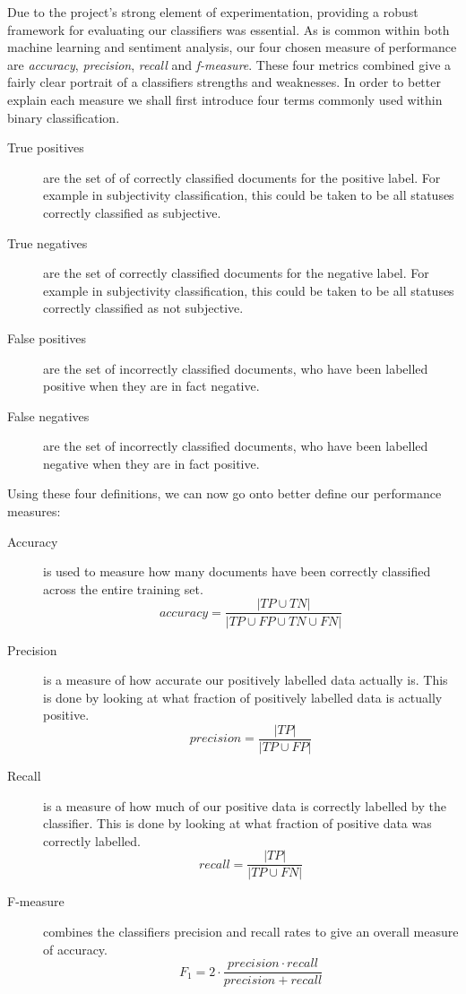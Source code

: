 Due to the project's strong element of experimentation, providing a robust framework for evaluating our classifiers was essential. As is common within both machine learning and sentiment analysis, our four chosen measure of performance are \emph{accuracy}, \emph{precision}, \emph{recall} and \emph{f-measure}. These four metrics combined give a fairly clear portrait of a classifiers strengths and weaknesses. In order to better explain each measure we shall first introduce four terms commonly used within binary classification.

\begin{description}
	\item [True positives] are the set of of correctly classified documents for the positive label. For example in subjectivity classification, this could be taken to be all statuses correctly classified as subjective.
	\item [True negatives] are the set of correctly classified documents for the negative label. For example in subjectivity classification, this could be taken to be all statuses correctly classified as not subjective.
	\item [False positives] are the set of incorrectly classified documents, who have been labelled positive when they are in fact negative.
	\item [False negatives] are the set of incorrectly classified documents, who have been labelled negative when they are in fact positive.
\end{description}

Using these four definitions, we can now go onto better define our performance measures:

\begin{description}
	\item [Accuracy] is used to measure how many documents have been correctly classified across the entire training set.
	\begin{equation}
		accuracy = \frac{| TP \cup TN |}{| TP \cup FP \cup TN \cup FN |}
	\end{equation}
	\item [Precision] is a measure of how accurate our positively labelled data actually is. This is done by looking at what fraction of positively labelled data is actually positive.
	\begin{equation}
		precision = \frac{| TP |}{| TP \cup FP |}
	\end{equation}
	\item [Recall] is a measure of how much of our positive data is correctly labelled by the classifier. This is done by looking at what fraction of positive data was correctly labelled.
	\begin{equation}
		recall = \frac{| TP |}{| TP \cup FN |}
	\end{equation}
	\item [F-measure] combines the classifiers precision and recall rates to give an overall measure of accuracy.
	\begin{equation}
		F_1 = 2 \cdot \frac{precision \cdot recall}{precision + recall}
	\end{equation}
\end{description}

